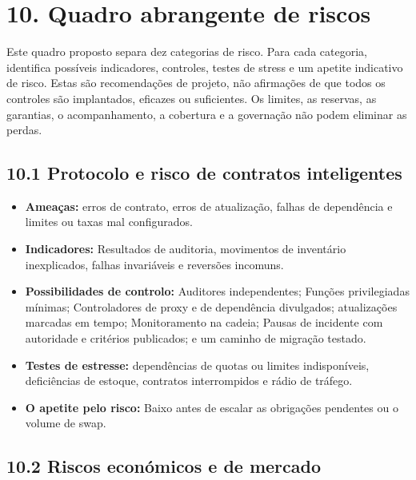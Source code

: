 \documentclass[11pt]{article}
\begin{document}
\section*{10. Quadro abrangente de riscos}

Este quadro proposto separa dez categorias de risco. Para cada categoria, identifica possíveis indicadores, controles, testes de stress e um apetite indicativo de risco. Estas são recomendações de projeto, não afirmações de que todos os controles são implantados, eficazes ou suficientes. Os limites, as reservas, as garantias, o acompanhamento, a cobertura e a governação não podem eliminar as perdas.

\subsection*{10.1 Protocolo e risco de contratos inteligentes}

\begin{itemize}[leftmargin=*]
\item \textbf{Ameaças:} erros de contrato, erros de atualização, falhas de dependência e limites ou taxas mal configurados.
\item \textbf{Indicadores:} Resultados de auditoria, movimentos de inventário inexplicados, falhas invariáveis e reversões incomuns.
\item \textbf{Possibilidades de controlo:} Auditores independentes; Funções privilegiadas mínimas; Controladores de proxy e de dependência divulgados; atualizações marcadas em tempo; Monitoramento na cadeia; Pausas de incidente com autoridade e critérios publicados; e um caminho de migração testado.
\item \textbf{Testes de estresse:} dependências de quotas ou limites indisponíveis, deficiências de estoque, contratos interrompidos e rádio de tráfego.
\item \textbf{O apetite pelo risco:} Baixo antes de escalar as obrigações pendentes ou o volume de swap.
\end{itemize}
\subsection*{10.2 Riscos económicos e de mercado}
\end{document}
